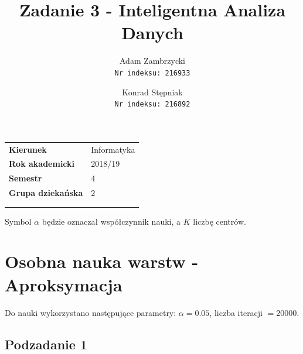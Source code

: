 \documentclass[a4paper, portrait,11pt]{article}
\title{\textbf{Zadanie 3 - Inteligentna Analiza Danych}}
\author{
  Adam Zambrzycki\\
  \texttt{Nr indeksu: 216933}
  \and
  Konrad Stępniak\\
  \texttt{Nr indeksu: 216892}
}
\begin{document}
\maketitle
  \begin{tabular}{ll}
    \textbf{Kierunek} & Informatyka\\
    \textbf{Rok akademicki} & {2018/19} \\
    \textbf{Semestr} & {4} \\
    \textbf{Grupa dziekańska}& {2} \\ \\ \\
  \end{tabular}

Symbol $\alpha$ będzie oznaczał współczynnik nauki, a $K$ liczbę centrów.

\section{Osobna nauka warstw - Aproksymacja}
Do nauki wykorzystano następujące parametry: $\alpha=0.05$, liczba iteracji $= 20000$.
\subsection{Podzadanie 1}
\end{document}
